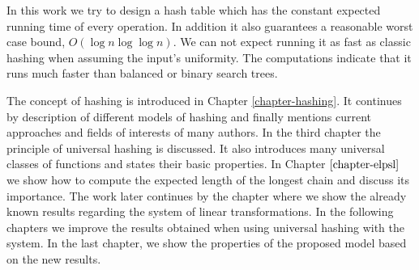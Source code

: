 In this work we try to design a hash table which has the constant expected running time of every operation. In addition it also guarantees a reasonable worst case bound, $O\left(\log n \log \log n\right)$. We can not expect running it as fast as classic hashing when assuming the input's uniformity. The computations indicate that it runs much faster than balanced or binary search trees.

The concept of hashing is introduced in Chapter \ref{chapter-hashing}. It continues by description of different models of hashing and finally mentions current approaches and fields of interests of many authors.
In the third chapter the principle of universal hashing is discussed. It also introduces many universal classes of functions and states their basic properties.
In Chapter $\ref{chapter-elpsl}$ we show how to compute the expected length of the longest chain and discuss its importance.
The work later continues by the chapter where we show the already known results regarding the system of linear transformations. In the following chapters we improve the results obtained when using universal hashing with the system. In the last chapter, we show the properties of the proposed model based on the new results.
